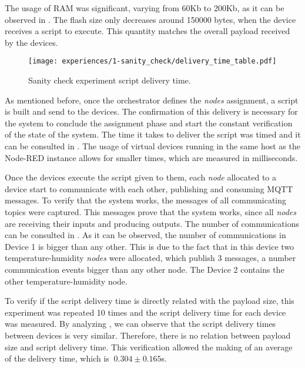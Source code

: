 The usage of RAM was significant, varying from 60Kb to 200Kb, as it can be observed in . The flash size only decreases around 150000 bytes, when the device receives a script to execute. This quantity matches the overall payload received by the devices.

\begin{figure}[h]
\centering
\texttt{[image: experiences/1-sanity\_check/delivery\_time\_table.pdf]}
\caption[Sanity check experiment script delivery time.]{Sanity check experiment script delivery time.}\label{fig:sanity_check_delivery_time}
\end{figure}

As mentioned before, once the orchestrator defines the \textit{nodes} assignment, a script is built and send to the devices. The confirmation of this delivery is necessary for the system to conclude the assignment phase and start the constant verification of the state of the system. The time it takes to deliver the script was timed and it can be consulted in . The usage of virtual devices running in the same host as the Node-RED instance allows for smaller times, which are measured in milliseconds.

Once the devices execute the script given to them, each \textit{node} allocated to a device start to communicate with each other, publishing and consuming MQTT messages. To verify that the system works, the messages of all communicating topics were captured. This messages prove that the system works, since all \textit{nodes} are receiving their inputs and producing outputs. The number of communications can be consulted in . As it can be observed, the number of communications in Device 1 is bigger than any other. This is due to the fact that in this device two temperature-humidity \textit{nodes} were allocated, which publish 3 messages, a number communication events bigger than any other node. The Device 2 contains the other temperature-humidity node.

To verify if the script delivery time is directly related with the payload size, this experiment was repeated 10 times and the script delivery time for each device was measured. By analyzing , we can observe that the script delivery times between devices is very similar. Therefore, there is no relation between payload size and script delivery time. This verification allowed the making of an average of the delivery time, which is $~0.304\pm0.165$s. 

